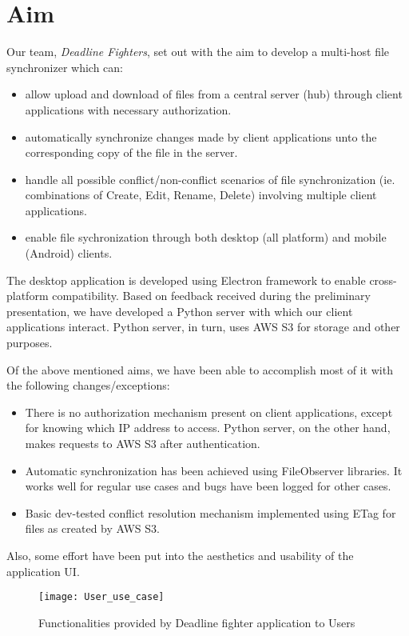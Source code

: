 \section{Aim}
Our team, \emph{Deadline Fighters}, set out with the aim to develop a multi-host file synchronizer which can:
\begin{itemize}
\item{allow upload and download of files from a central server (hub) through client applications with necessary authorization.}
\item{automatically synchronize changes made by client applications unto the corresponding copy of the file in the server.}
\item{handle all possible conflict/non-conflict scenarios of file synchronization (ie. combinations of Create, Edit, Rename, Delete) involving multiple client applications.}
\item{enable file sychronization through both desktop (all platform) and mobile (Android) clients.}
\end{itemize}

The desktop application is developed using Electron framework to enable cross-platform compatibility. Based on feedback received during the preliminary presentation, we have developed a Python server with which our client applications interact. Python server, in turn, uses AWS S3 for storage and other purposes.

Of the above mentioned aims, we have been able to accomplish most of it with the following changes/exceptions:

\begin{itemize}
	\item{There is no authorization mechanism present on client applications, except for knowing which IP address to access. Python server, on the other hand, makes requests to AWS S3 after authentication.}
	\item{Automatic synchronization has been achieved using FileObserver libraries. It works well for regular use cases and bugs have been logged for other cases.}
	\item{Basic dev-tested conflict resolution mechanism implemented using ETag for files as created by AWS S3.}
\end{itemize}

Also, some effort have been put into the aesthetics and usability of the application UI.\newline

\begin{figure}[h!]
\centering
\texttt{[image: User\_use\_case]}

\caption{Functionalities provided by Deadline fighter application to Users}
\end{figure}

